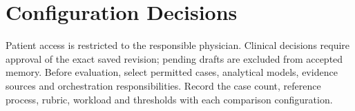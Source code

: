 \section{Configuration Decisions}
Patient access is restricted to the responsible physician. Clinical decisions require approval of the exact saved revision; pending drafts are excluded from accepted memory. Before evaluation, select permitted cases, analytical models, evidence sources and orchestration responsibilities. Record the case count, reference process, rubric, workload and thresholds with each comparison configuration.

\endgroup
